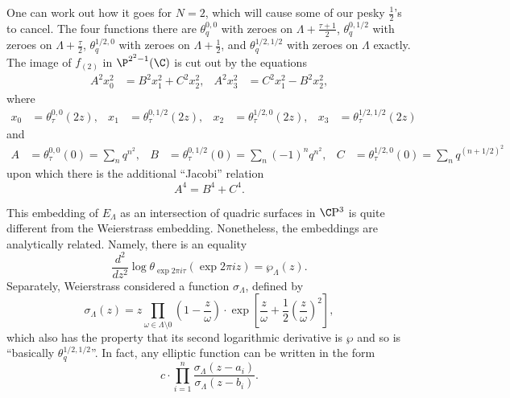 \begin{example}
One can work out how it goes for $N = 2$, which will cause some of our pesky $\frac{1}{2}$'s to cancel.  The four functions there are $\theta_q^{0,0}$ with zeroes on $\Lambda + \frac{\tau + 1}{2}$, $\theta_q^{0,1/2}$ with zeroes on $\Lambda + \frac{\tau}{2}$, $\theta_q^{1/2,0}$ with zeroes on $\Lambda + \frac{1}{2}$, and $\theta_q^{1/2,1/2}$ with zeroes on $\Lambda$ exactly.  The image of $f_{(2)}$ in $\P^{2^2 - 1}(\C)$ is cut out by the equations
\begin{align*}
A^2 x_0^2 & = B^2 x_1^2 + C^2 x_2^2, &
A^2 x_3^2 & = C^2 x_1^2 - B^2 x_2^2,
\end{align*}
where
\begin{align*}
x_0 & = \theta_\tau^{0, 0}(2z), &
x_1 & = \theta_\tau^{0, 1/2}(2z), &
x_2 & = \theta_\tau^{1/2, 0}(2z), &
x_3 & = \theta_\tau^{1/2, 1/2}(2z)
\end{align*}
and
\begin{align*}
A & = \theta_\tau^{0, 0}(0) = \sum_n q^{n^2}, &
B & = \theta_\tau^{0, 1/2}(0) = \sum_n (-1)^n q^{n^2}, &
C & = \theta_\tau^{1/2, 0}(0) = \sum_n q^{(n + 1/2)^2}
\end{align*}
upon which there is the additional ``Jacobi'' relation \[A^4 = B^4 + C^4.\]
\end{example}

\begin{remark}
This embedding of $E_\Lambda$ as an intersection of quadric surfaces in $\CP^3$ is quite different from the Weierstrass embedding.  Nonetheless, the embeddings are analytically related.  Namely, there is an equality \[\frac{d^2}{dz^2} \log \theta_{\exp{2 \pi i \tau}}(\exp{2 \pi i z}) = \wp_\Lambda(z).\]  Separately, Weierstrass considered a function $\sigma_\Lambda$, defined by \[\sigma_\Lambda(z) = z \prod_{\omega \in \Lambda \setminus 0} \left( 1 - \frac{z}{\omega} \right) \cdot \exp \left[ \frac{z}{\omega} + \frac{1}{2} \left( \frac{z}{\omega} \right)^2 \right],\] which also has the property that its second logarithmic derivative is $\wp$ and so is ``basically $\theta_q^{1/2,1/2}$''.  In fact, any elliptic function can be written in the form \[c \cdot \prod_{i=1}^n \frac{\sigma_\Lambda(z - a_i)}{\sigma_\Lambda(z - b_i)}.\]
\end{remark}

